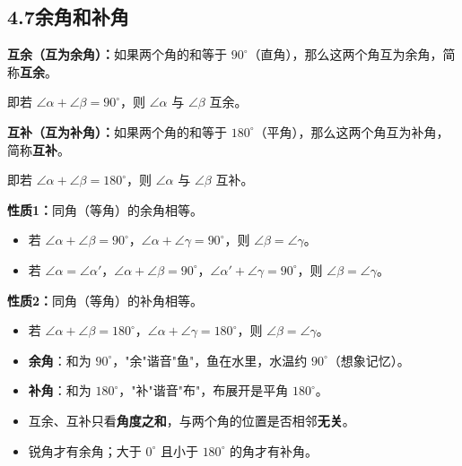 \documentclass[12pt, a4paper]{ctexart}
\begin{document}
\subsection*{4.7\quad 余角和补角}

\begin{knowledgebox}[互余与互补]
\textbf{互余（互为余角）：}如果两个角的和等于 $90^\circ$（直角），那么这两个角互为余角，简称\textbf{互余}。

即若 $\angle\alpha+\angle\beta=90^\circ$，则 $\angle\alpha$ 与 $\angle\beta$ 互余。

\textbf{互补（互为补角）：}如果两个角的和等于 $180^\circ$（平角），那么这两个角互为补角，简称\textbf{互补}。

即若 $\angle\alpha+\angle\beta=180^\circ$，则 $\angle\alpha$ 与 $\angle\beta$ 互补。
\end{knowledgebox}

\begin{knowledgebox}[余角和补角的性质]
\textbf{性质1：}同角（等角）的余角相等。

\begin{itemize}[nosep]
  \item 若 $\angle\alpha+\angle\beta=90^\circ$，$\angle\alpha+\angle\gamma=90^\circ$，则 $\angle\beta=\angle\gamma$。
  \item 若 $\angle\alpha=\angle\alpha'$，$\angle\alpha+\angle\beta=90^\circ$，$\angle\alpha'+\angle\gamma=90^\circ$，则 $\angle\beta=\angle\gamma$。
\end{itemize}

\textbf{性质2：}同角（等角）的补角相等。

\begin{itemize}[nosep]
  \item 若 $\angle\alpha+\angle\beta=180^\circ$，$\angle\alpha+\angle\gamma=180^\circ$，则 $\angle\beta=\angle\gamma$。
\end{itemize}
\end{knowledgebox}

\begin{tipbox}[记忆技巧]
\begin{itemize}[nosep]
  \item \textbf{余角}：和为 $90^\circ$，"余"谐音"鱼"，鱼在水里，水温约 $90^\circ$（想象记忆）。
  \item \textbf{补角}：和为 $180^\circ$，"补"谐音"布"，布展开是平角 $180^\circ$。
  \item 互余、互补只看\textbf{角度之和}，与两个角的位置是否相邻\textbf{无关}。
  \item 锐角才有余角；大于 $0^\circ$ 且小于 $180^\circ$ 的角才有补角。
\end{itemize}
\end{tipbox}
\end{document}
